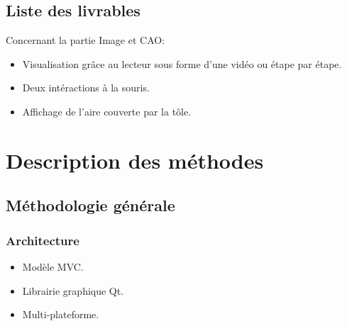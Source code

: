 \documentclass{beamer}
\begin{document}
\subsection{Liste des livrables}
\begin{frame}
    Concernant la partie Image et CAO:
    \begin{itemize}
        \item Visualisation grâce au lecteur sous forme d'une vidéo ou étape par étape.
        \item Deux intéractions à la souris.
        \item Affichage de l'aire couverte par la tôle.
    \end{itemize}
\end{frame}

\section{Description des méthodes}
\subsection{Méthodologie générale}
\begin{frame}
    \frametitle{Architecture}
    \begin{itemize}
        \item Modèle MVC.
        \item Librairie graphique Qt.
        \item Multi-plateforme.
    \end{itemize}
\end{frame}
\end{document}
